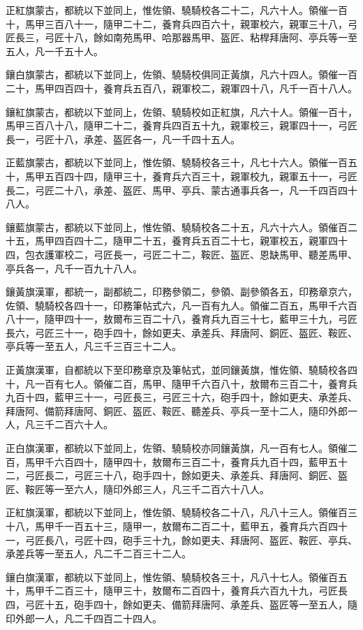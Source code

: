 \begin{pinyinscope}
正紅旗蒙古，都統以下並同上，惟佐領、驍騎校各二十二，凡六十人。領催一百十，馬甲三百八十一，隨甲二十二，養育兵四百六十，親軍校六，親軍三十八，弓匠長三，弓匠十八，餘如南苑馬甲、哈那器馬甲、盔匠、粘桿拜唐阿、亭兵等一至五人，凡一千五十人。

鑲白旗蒙古，都統以下並同上，佐領、驍騎校俱同正黃旗，凡六十四人。領催一百二十，馬甲四百四十，養育兵五百八，親軍校二，親軍四十八，凡千一百十八人。

鑲紅旗蒙古，都統以下並同上，佐領、驍騎校如正紅旗，凡六十人。領催一百十，馬甲三百八十八，隨甲二十二，養育兵四百五十九，親軍校三，親軍四十一，弓匠長一，弓匠十八，承差、盔匠各一，凡一千四十五人。

正藍旗蒙古，都統以下並同上，惟佐領、驍騎校各三十，凡七十六人。領催一百五十，馬甲五百四十四，隨甲三十，養育兵六百三十，親軍校九，親軍五十一，弓匠長二，弓匠二十八，承差、盔匠、馬甲、亭兵、蒙古通事兵各一，凡一千四百四十八人。

鑲藍旗蒙古，都統以下並同上，惟佐領、驍騎校各二十五，凡六十六人。領催百二十五，馬甲四百四十二，隨甲二十五，養育兵五百二十七，親軍校五，親軍四十四，包衣護軍校二，弓匠長一，弓匠二十二，鞍匠、盔匠、恩缺馬甲、聽差馬甲、亭兵各一，凡千一百九十八人。

鑲黃旗漢軍，都統一，副都統二，印務參領二，參領、副參領各五，印務章京六，佐領、驍騎校各四十一，印務筆帖式六，凡一百有九人。領催二百五，馬甲千六百八十一，隨甲四十一，敖爾布三百二十八，養育兵九百三十七，藍甲三十九，弓匠長六，弓匠三十一，砲手四十，餘如更夫、承差兵、拜唐阿、銅匠、盔匠、鞍匠、亭兵等一至五人，凡三千三百三十二人。

正黃旗漢軍，自都統以下至印務章京及筆帖式，並同鑲黃旗，惟佐領、驍騎校各四十，凡一百有七人。領催二百，馬甲、隨甲千六百八十，敖爾布三百二十，養育兵九百十四，藍甲三十一，弓匠長三，弓匠三十六，砲手四十，餘如更夫、承差兵、拜唐阿、備箭拜唐阿、銅匠、盔匠、鞍匠、聽差兵、亭兵一至十二人，隨印外郎一人，凡三千二百六十人。

正白旗漢軍，都統以下並同上，佐領、驍騎校亦同鑲黃旗，凡一百有七人。領催二百，馬甲千六百四十，隨甲四十，敖爾布三百二十，養育兵九百十四，藍甲五十二，弓匠長二，弓匠三十八，砲手四十，餘如更夫、承差兵、拜唐阿、銅匠、盔匠、鞍匠等一至六人，隨印外郎三人，凡三千二百六十八人。

正紅旗漢軍，都統以下並同上，惟佐領、驍騎校各二十八，凡八十三人。領催百三十八，馬甲千一百五十三，隨甲一，敖爾布二百二十，藍甲五，養育兵六百四十一，弓匠長八，弓匠十四，砲手三十九，餘如更夫、拜唐阿、盔匠、鞍匠、亭兵、承差兵等一至五人，凡二千二百三十二人。

鑲白旗漢軍，都統以下並同上，惟佐領、驍騎校各三十，凡八十七人。領催百五十，馬甲千二百三十，隨甲三十，敖爾布二百四十，養育兵六百九十九，弓匠長四，弓匠十五，砲手四十，餘如更夫、備箭拜唐阿、承差兵、盔匠等一至五人，隨印外郎一人，凡二千四百二十四人。


\end{pinyinscope}

